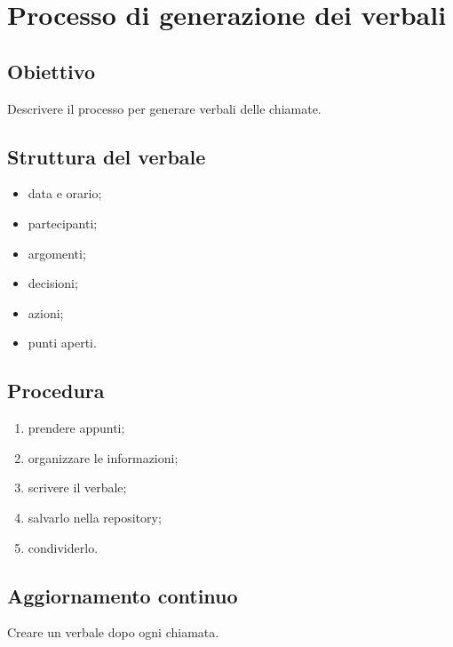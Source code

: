 \chapter{Processo di generazione dei verbali}
\label{chap:verbali}

\section{Obiettivo}
Descrivere il processo per generare verbali delle chiamate.

\section{Struttura del verbale}
\begin{itemize}
  \item data e orario;
  \item partecipanti;
  \item argomenti;
  \item decisioni;
  \item azioni;
  \item punti aperti.
\end{itemize}

\section{Procedura}
\begin{enumerate}
  \item prendere appunti;
  \item organizzare le informazioni;
  \item scrivere il verbale;
  \item salvarlo nella repository;
  \item condividerlo.
\end{enumerate}

\section{Aggiornamento continuo}
Creare un verbale dopo ogni chiamata.